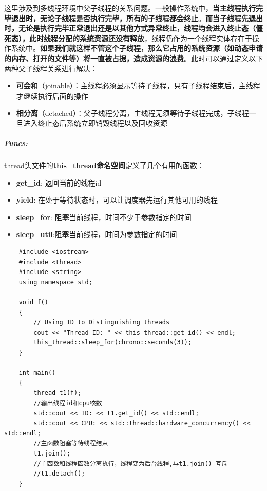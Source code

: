 \documentclass[UTF8,a4paper,12pt]{ctexbook}
\begin{document}
		这里涉及到多线程环境中父子线程的关系问题。一般操作系统中，\textbf{当主线程执行完毕退出时，无论子线程是否执行完毕，所有的子线程都会终止}。\textbf{而当子线程先退出时，无论是执行完毕正常退出还是以其他方式异常终止，线程均会进入终止态（僵死态），此时线程分配的系统资源还没有释放}，线程仍作为一个线程实体存在于操作系统中。\textbf{如果我们就这样不管这个子线程，那么它占用的系统资源（如动态申请的内存、打开的文件等）将一直被占据，造成资源的浪费}。此时可以通过定义以下两种父子线程关系进行解决：
		
		\begin{itemize}
			\item \textbf{可会和}（joinable）：主线程必须显示等待子线程，只有子线程结束后，主线程才继续执行后面的操作
			\item \textbf{相分离}（detached）：父子线程分离，主线程无须等待子线程完成，子线程一旦进入终止态后系统立即销毁线程以及回收资源
		\end{itemize}
		
		\subparagraph{Funcs:}thread头文件的\textbf{this\_thread命名空间}定义了几个有用的函数：
		\begin{itemize}
			\item \textbf{get\_id}:    返回当前的线程id
			\item \textbf{yield}:  	   在处于等待状态时，可以让调度器先运行其他可用的线程
			\item \textbf{sleep\_for}: 阻塞当前线程，时间不少于参数指定的时间
			\item \textbf{sleep\_util}:阻塞当前线程，时间为参数指定的时间
		\end{itemize}
		\begin{lstlisting}
	#include <iostream>
	#include <thread>
	#include <string>
	using namespace std;
	
	void f()
	{
		// Using ID to Distinguishing threads 
		cout << "Thread ID: " << this_thread::get_id() << endl;
		this_thread::sleep_for(chrono::seconds(3));
	}
	
	int main()
	{
		thread t1(f);
		//输出线程id和cpu核数
		std::cout << ID: << t1.get_id() << std::endl;
		std::cout << CPU: << std::thread::hardware_concurrency() << std::endl;
		//主函数阻塞等待线程结束
		t1.join();
		//主函数和线程函数分离执行，线程变为后台线程,与t1.join() 互斥
		//t1.detach();
	}
		\end{lstlisting}
\end{document}
